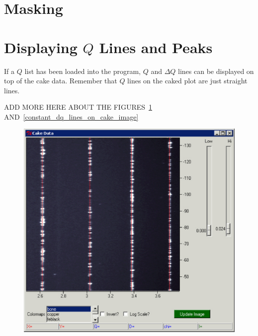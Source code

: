 \section{Masking}

\section{\texorpdfstring{Displaying $Q$ Lines and Peaks}
    {Displaying Q Lines and Peaks}}
    \label{cakeQlinesandpeaks}

If a $Q$ list has been loaded into the program, 
$Q$ and $\Delta Q$ lines can be displayed on top
of the cake data. Remember that $Q$ lines on the
caked plot are just straight lines. 

ADD MORE HERE ABOUT THE FIGURES~\ref{constant_q_lines_on_cake_image}
AND~\ref{constant_dq_lines_on_cake_image}

\begin{figure}
    \centering
    \includegraphics[scale=.75]{figures/constant_q_lines_on_cake_image.eps}
    \caption{}
    \label{constant_q_lines_on_cake_image}
\end{figure}

